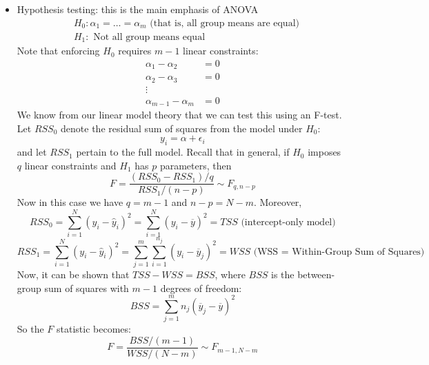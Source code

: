 \documentclass[12pt]{article}
\begin{document}
\begin{itemize}
	\item Hypothesis testing: this is the main emphasis of ANOVA
	\begin{align*} 
	&H_0: \alpha_1 = \dots = \alpha_m \text{ (that is, all group means are equal)} \\
	&H_1: \text{ Not all group means equal}
	\end{align*} 
	Note that enforcing $H_0$ requires $m - 1$ linear constraints: 
	\begin{align*} 
	\alpha_1 - \alpha_2 &= 0 \\
	\alpha_2 - \alpha_3 &= 0 \\
	\vdots \\
	\alpha_{m - 1} - \alpha_m &= 0
	\end{align*} 
	We know from our linear model theory that we can test this using an F-test. Let $RSS_0$ denote the residual sum of squares from the model under $H_0$: 
	\[y_{i} = \alpha + \epsilon_{i}\]
	and let $RSS_1$ pertain to the full model. Recall that in general, if $H_0$ imposes $q$ linear constraints and $H_1$ has $p$ parameters, then 
	\[F = \frac{(RSS_0 - RSS_1)/q}{RSS_1/(n - p)} \sim F_{q, n - p}\]
	Now in this case we have $q = m - 1$ and $n - p = N - m$. Moreover, 
	\[RSS_0 = \sum_{i = 1}^{N} (y_i - \hat{y}_i)^2 = \sum_{i = 1}^{N} (y_i - \overline{y})^2 = TSS \text{ (intercept-only model)}\]
	\[RSS_1 = \sum_{i = 1}^{N} (y_i - \hat{y}_i)^2 = \sum_{j = 1}^{m} \sum_{i = 1}^{n_j} (y_i - \overline{y}_j)^2 = WSS \text{ (WSS = Within-Group Sum of Squares)}\]
	Now, it can be shown that $TSS - WSS = BSS$, where $BSS$ is the between-group sum of squares with $m - 1$ degrees of freedom: 
	\[BSS = \sum_{j = 1}^{m} n_j(\overline{y}_j - \overline{y})^2\]
	So the $F$ statistic becomes: 
	\[F = \frac{BSS/(m - 1)}{WSS/(N - m)} \sim F_{m - 1, N - m}\]
	\end{itemize} 
\end{document}
